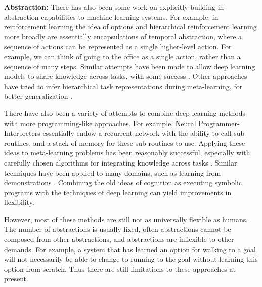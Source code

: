 \textbf{Abstraction:} There has also been some work on explicitly building in abstraction capabilities to machine learning systems. For example, in reinforcement learning the idea of options \citep{Sutton1999} and hierarchical reinforcement learning more broadly \citep[e.g.][]{Botvinick2009} are essentially encapsulations of temporal abstraction, where a sequence of actions can be represented as a single higher-level action. For example, we can think of going to the office as a single action, rather than a sequence of many steps. Similar attempts have been made to allow deep learning models to share knowledge across tasks, with some success \citep[e.g.][]{Tessler2016}. Other approaches have tried to infer hierarchical task representations during meta-learning, for better generalization \citep{Yao2019}. \par 
There have also been a variety of attempts to combine deep learning methods with more programming-like approaches. For example, Neural Programmer-Interpreters \citep{Reed2015} essentially endow a recurrent network with the ability to call sub-routines, and a stack of memory for these sub-routines to use. Applying these ideas to meta-learning problems has been reasonably successful, especially with carefully chosen algorithms for integrating knowledge across tasks \citep[e.g.]{Devlin2017}. Similar techniques have been applied to many domains, such as learning from demonstrations \citep[e.g.][]{Xu2017a}. Combining the old ideas of cognition as executing symbolic programs \citep{Newell1961} with the techniques of deep learning can yield improvements in flexibility. \par  
However, most of these methods are still not as universally flexible as humans. The number of abstractions is usually fixed, often abstractions cannot be composed from other abstractions, and abstractions are inflexible to other demands. For example, a system that has learned an option for walking to a goal will not necessarily be able to change to running to the goal without learning this option from scratch. Thus there are still limitations to these approaches at present. \par 

